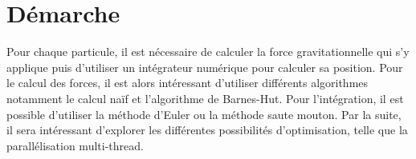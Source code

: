\section{Démarche}


Pour chaque particule, il est nécessaire de calculer la force gravitationnelle qui s'y applique puis d'utiliser un intégrateur numérique pour calculer sa position. Pour le calcul des forces, il est alors intéressant d'utiliser différents algorithmes notamment le calcul naïf et l'algorithme de Barnes-Hut. Pour l'intégration, il est possible d'utiliser la méthode d'Euler ou la méthode saute mouton.
Par la suite, il sera intéressant d'explorer les différentes possibilités d'optimisation, telle que la parallélisation multi-thread. 